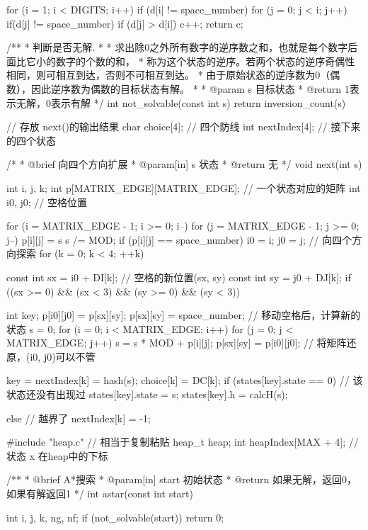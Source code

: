 \begin{Codex}[label=eight_digits_astar.c]
{    for (i = 1; i < DIGITS; i++)  if (d[i] != space_number) {
        for (j = 0; j < i; j++) {
            if(d[j] != space_number) {
                if (d[j] > d[i]) {
                    c++;
                }
            }
        }
    }
    return c;
}

/**
 * 判断是否无解.
 *
 * 求出除0之外所有数字的逆序数之和，也就是每个数字后面比它小的数字的个数的和，
 * 称为这个状态的逆序。若两个状态的逆序奇偶性相同，则可相互到达，否则不可相互到达。
 * 由于原始状态的逆序数为0（偶数），因此逆序数为偶数的目标状态有解。
 *
 * @param s 目标状态
 * @return 1表示无解，0表示有解
 */
int not_solvable(const int s) {
    return inversion_count(s) %
}

// 存放 next()的输出结果
char choice[4]; // 四个防线
int nextIndex[4]; // 接下来的四个状态

/*
 * @brief 向四个方向扩展
 * @param[in] s 状态
 * @return 无
 */
void next(int s) {
    int i, j, k;
    int p[MATRIX_EDGE][MATRIX_EDGE]; // 一个状态对应的矩阵
    int i0, j0;  // 空格位置

    for (i = MATRIX_EDGE - 1; i >= 0; i--) {
        for (j = MATRIX_EDGE - 1; j >= 0; j--) {
            p[i][j] = s %
            s /= MOD;
            if (p[i][j] == space_number) {
                i0 = i;
                j0 = j;
            }
        }
    }
    // 向四个方向探索
    for (k = 0; k < 4; ++k) {
        const int sx = i0 + DI[k]; // 空格的新位置(sx, sy)
        const int sy = j0 + DJ[k];
        if ((sx >= 0) && (sx < 3) && (sy >= 0) && (sy < 3)) {
            int key;
            p[i0][j0] = p[sx][sy];
            p[sx][sy] = space_number;
            // 移动空格后，计算新的状态
            s = 0;
            for (i = 0; i < MATRIX_EDGE; i++)
                for (j = 0; j < MATRIX_EDGE; j++)
                    s = s * MOD + p[i][j];
            p[sx][sy] = p[i0][j0]; // 将矩阵还原，(i0, j0)可以不管
            
            key = nextIndex[k] = hash(s);
            choice[k] = DC[k];
            if (states[key].state == 0) { // 该状态还没有出现过
                states[key].state = s;
                states[key].h = calcH(s);
            }
        } else {// 越界了
            nextIndex[k] = -1;
        }
    }
}


#include "heap.c" // 相当于复制粘贴
heap_t heap;
int heapIndex[MAX + 4]; // 状态 x 在heap中的下标

/**
 * @brief A*搜索
 * @param[in] start 初始状态
 * @return 如果无解，返回0，如果有解返回1
 */
int astar(const int start) {
    int i, j, k, ng, nf;
    if (not_solvable(start)) return 0;

}
\end{Codex}
